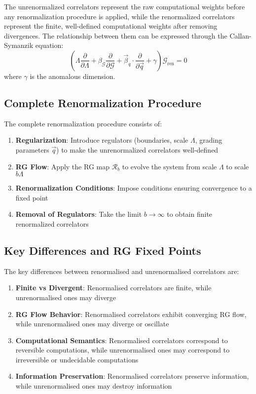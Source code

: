 The unrenormalized correlators represent the raw computational weights before any renormalization procedure is applied, while the renormalized correlators represent the finite, well-defined computational weights after removing divergences. The relationship between them can be expressed through the Callan-Symanzik equation:
\[
\left(\Lambda \frac{\partial}{\partial \Lambda} + \beta_{\mathcal{G}} \frac{\partial}{\partial \mathcal{G}} + \vec{\beta}_q \cdot \frac{\partial}{\partial \vec{q}} + \gamma\right) \mathcal{G}_{\text{ren}} = 0
\]
where $\gamma$ is the anomalous dimension.

\subsection{Complete Renormalization Procedure}

\begin{definition}
\label{def:complete-renormalization}
The complete renormalization procedure consists of:
\begin{enumerate}
\item \textbf{Regularization}: Introduce regulators (boundaries, scale $\Lambda$, grading parameters $\vec{q}$) to make the unrenormalized correlators well-defined
\item \textbf{RG Flow}: Apply the RG map $\mathcal{R}_b$ to evolve the system from scale $\Lambda$ to scale $b\Lambda$
\item \textbf{Renormalization Conditions}: Impose conditions ensuring convergence to a fixed point
\item \textbf{Removal of Regulators}: Take the limit $b \to \infty$ to obtain finite renormalized correlators
\end{enumerate}
\end{definition}

\subsection{Key Differences and RG Fixed Points}

\begin{theorem}
\label{thm:renormalised-difference}
The key differences between renormalised and unrenormalised correlators are:
\begin{enumerate}
\item \textbf{Finite vs Divergent}: Renormalised correlators are finite, while unrenormalised ones may diverge
\item \textbf{RG Flow Behavior}: Renormalised correlators exhibit converging RG flow, while unrenormalised ones may diverge or oscillate
\item \textbf{Computational Semantics}: Renormalised correlators correspond to reversible computations, while unrenormalised ones may correspond to irreversible or undecidable computations
\item \textbf{Information Preservation}: Renormalised correlators preserve information, while unrenormalised ones may destroy information
\end{enumerate}
\end{theorem}

